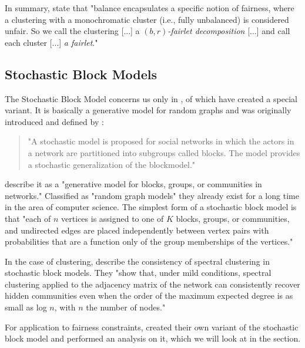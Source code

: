 In summary, \textcite[4]{Chierichetti2018} state that "balance encapsulates a specific notion of fairness, where a clustering with a monochromatic cluster (i.e., fully unbalanced) is considered unfair. So we call the clustering [...] a $(b, r)$\textit{-fairlet decomposition} [...] and call each cluster [...] \textit{a fairlet}." \autocite[4]{Chierichetti2018}


\subsection{Stochastic Block Models}

The Stochastic Block Model concerns us only in , of which \textcite{Kleindessner2019} have created a special variant. It is basically a generative model for random graphs and was originally introduced and defined by \textcite[]{Holland1983}:

\begin{quote}
"A stochastic model is proposed for social networks in which the actors in a network are partitioned into subgroups called blocks. The model provides a stochastic generalization of the blockmodel."
\autocite[1]{Holland1983}
\end{quote}

\textcite[1]{Karrer2010StochasticNetworks} describe it as a "generative model for blocks, groups, or communities in networks." Classified as "random graph models" they already exist for a long time in the area of computer science.
The simplest form of a stochastic block model is that "each of $n$ vertices is assigned to one of $K$ blocks, groups, or communities, and undirected edges are placed independently between vertex pairs with probabilities that are a function only of the group memberships of the vertices." \autocite[1]{Karrer2010StochasticNetworks}

In the case of clustering, \textcite[]{Lei2013} describe the consistency of spectral clustering in stochastic block models. They "show that, under mild conditions, spectral clustering applied to the adjacency matrix of the network can consistently recover hidden communities even when the order of the maximum expected degree is as small as log $n$, with $n$ the number of nodes." \autocite[1]{Lei2013}

For application to fairness constraints, \textcite[4]{Kleindessner2019} created their own variant of the stochastic block model and performed an analysis on it, which we will look at in the  section.